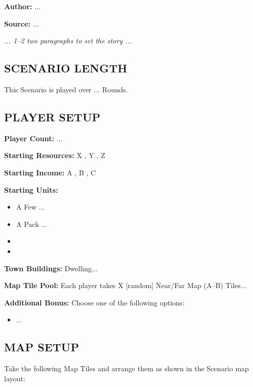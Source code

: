 
\begin{multicols*}{2}

\textbf{Author:} ...

\textbf{Source:} ...

\textit{... 1--2 two paragraphs to set the story ...}

\subsection*{\MakeUppercase{Scenario Length}}

This Scenario is played over ... Rounds.

\subsection*{\MakeUppercase{Player Setup}}

\textbf{Player Count:} ...

\textbf{Starting Resources:} X , Y , Z 

\textbf{Starting Income:} A , B , C 

\textbf{Starting Units:}
\begin{itemize}
  \item A Few ...
  \item A Pack ...
  \item {}
  \item {}
\end{itemize}

\textbf{Town Buildings:}  Dwelling...

\textbf{Map Tile Pool:} Each player takes X [random] Near/Far Map (A--B) Tiles...

\textbf{Additional Bonus:} Choose one of the following options:

\begin{itemize}
    \item ...
\end{itemize}

\subsection*{\MakeUppercase{Map Setup}}

Take the following Map Tiles and arrange them as shown in the Scenario map layout:


\end{multicols*}
